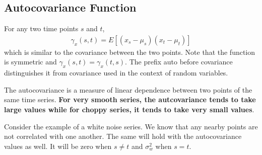 \documentclass[../../time_series_notes.tex]{subfiles}
\begin{document}
\subsection{Autocovariance Function}
For any two time points $s$ and $t$,
\begin{align*}
    \gamma_{x}(s, t) = E[(x_{s} - \mu_{s})(x_{t} - \mu_{t})]
\end{align*}
which is similar to the covariance between the two points. Note that the function is symmetric and $\gamma_{x}(s, t) = \gamma_{x}(t, s)$. The prefix auto before covariance distinguishes it from covariance used in the context of random variables.\newline

The autocovariance is a measure of linear dependence between two points of the same time series. \textbf{For very smooth series, the autcovariance tends to take large values while for choppy series, it tends to take very small values}.\newline

Consider the example of a white noise series. We know that any nearby points are not correlated with one another. The same will hold with the autocovariance values as well. It will be zero when $s \neq t$ and $\sigma_{w}^{2}$ when $s = t$.\newline
\end{document}
